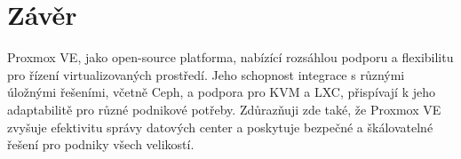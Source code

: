 \chapter{Závěr}

Proxmox VE, jako open-source platforma, nabízící rozsáhlou podporu a flexibilitu pro řízení virtualizovaných prostředí. Jeho schopnost integrace s různými úložnými řešeními, včetně Ceph, a podpora pro KVM a LXC, přispívají k jeho adaptabilitě pro různé podnikové potřeby. Zdůrazňuji zde také, že Proxmox VE zvyšuje efektivitu správy datových center a poskytuje bezpečné a škálovatelné řešení pro podniky všech velikostí.